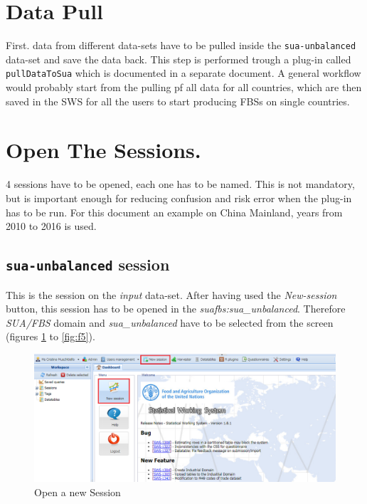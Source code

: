 \documentclass[]{article}
\begin{document}
\section{Data Pull}\label{data-pull}

First. data from different data-sets have to be pulled inside the
\texttt{sua-unbalanced} data-set and save the data back. This step is
performed trough a plug-in called \texttt{pullDataToSua} which is
documented in a separate document. A general workflow would probably
start from the pulling pf all data for all countries, which are then
saved in the SWS for all the users to start producing FBSs on single
countries.

\section{Open The Sessions.}\label{open-the-sessions.}

4 sessions have to be opened, each one has to be named. This is not
mandatory, but is important enough for reducing confusion and risk error
when the plug-in has to be run. For this document an example on China
Mainland, years from 2010 to 2016 is used.

\subsection{\texorpdfstring{\texttt{sua-unbalanced}
session}{sua-unbalanced session}}\label{sua-unbalanced-session}

This is the session on the \emph{input} data-set. After having used the
\emph{New-session} button, this session has to be opened in the
\emph{suafbs:sua\_unbalanced}. Therefore \emph{SUA/FBS} domain and
\emph{sua\_unbalanced} have to be selected from the screen (figures
\ref{fig:f3} to \ref{fig:f5}).

\begin{figure}[H]

{\centering \includegraphics[width=1\linewidth]{images/standPlugin/03_NewSession2} 

}

\caption{\label{fig:f3}Open a new Session}\label{fig:f3}
\end{figure}
\end{document}
